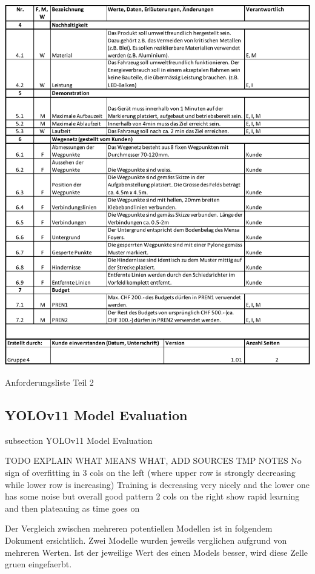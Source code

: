 \begin{table}[H]
\centering
\includegraphics[width=\textwidth]{assets/projektmanagement/Anforderungsliste_V1.01_page2.pdf}
\caption{Anforderungsliste Teil 2}
\label{table:anforderungsliste_page2}
\end{table}
\newpage



\subsection*{YOLOv11 Model Evaluation}\label{model-evaluation}
    {subsection}
    {YOLOv11 Model Evaluation}


TODO EXPLAIN WHAT MEANS WHAT, ADD SOURCES
TMP NOTES No sign of overfitting in 3 cols on the left (where upper row is strongly decreasing while lower row is increasing)
Training is decreasing very nicely and the lower one has some noise but overall good pattern
2 cols on the right show rapid learning and then plateauing as time goes on

Der Vergleich zwischen mehreren potentiellen Modellen ist in folgendem Dokument ersichtlich. Zwei Modelle wurden jeweils verglichen aufgrund von mehreren Werten. Ist der jeweilige Wert des einen Models besser, wird diese Zelle gruen eingefaerbt.


